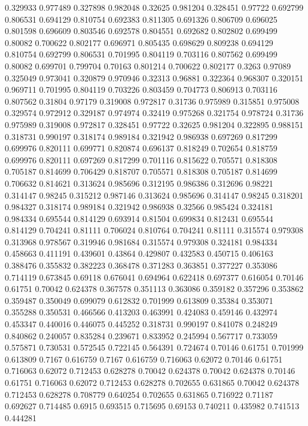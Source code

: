 0.329933 0.977489
0.327898 0.982048
0.32625 0.981204
0.328451 0.97722
0.692799 0.806531
0.694129 0.810754
0.692383 0.811305
0.691326 0.806709
0.696025 0.801598
0.696609 0.803546
0.692578 0.804551
0.692682 0.802802
0.699499 0.80082
0.700622 0.802177
0.696971 0.805435
0.698629 0.809238
0.694129 0.810754
0.692799 0.806531
0.701995 0.804119
0.703116 0.807562
0.699499 0.80082
0.699701 0.799704
0.70163 0.801214
0.700622 0.802177
0.3263 0.97089
0.325049 0.973041
0.320879 0.970946
0.32313 0.96881
0.322364 0.968307
0.320151 0.969711
0.701995 0.804119
0.703226 0.803459
0.704773 0.806913
0.703116 0.807562
0.31804 0.97179
0.319008 0.972817
0.31736 0.975989
0.315851 0.975008
0.329574 0.972912
0.329187 0.974974
0.32419 0.975268
0.321754 0.978724
0.31736 0.975989
0.319008 0.972817
0.328451 0.97722
0.32625 0.981204
0.322895 0.988151
0.318731 0.990197
0.318174 0.989184
0.321942 0.986938
0.697269 0.817299
0.699976 0.820111
0.699771 0.820874
0.696137 0.818249
0.702654 0.818759
0.699976 0.820111
0.697269 0.817299
0.701116 0.815622
0.705571 0.818308
0.705187 0.814699
0.706429 0.818707
0.705571 0.818308
0.705187 0.814699
0.706632 0.814621
0.313624 0.985696
0.312195 0.986386
0.312696 0.98221
0.314147 0.98245
0.315212 0.987146
0.313624 0.985696
0.314147 0.98245
0.318201 0.984327
0.318174 0.989184
0.321942 0.986938
0.32566 0.985424
0.324181 0.984334
0.695544 0.814129
0.693914 0.81504
0.699834 0.812431
0.695544 0.814129
0.704241 0.81111
0.706024 0.810764
0.704241 0.81111
0.315574 0.979308
0.313968 0.978567
0.319946 0.981684
0.315574 0.979308
0.324181 0.984334
0.458663 0.411191
0.439601 0.43864
0.429807 0.432583
0.450715 0.406163
0.388476 0.355832
0.382223 0.368478
0.371283 0.363851
0.377227 0.353086
0.714119 0.673845
0.69118 0.676041
0.694964 0.622418
0.697377 0.616054
0.70146 0.61751
0.70042 0.624378
0.367578 0.351113
0.363086 0.359182
0.357296 0.353862
0.359487 0.350049
0.699079 0.612832
0.701999 0.613809
0.35384 0.353071
0.355288 0.350531
0.466566 0.413203
0.463991 0.424083
0.459146 0.432974
0.453347 0.440016
0.446075 0.445252
0.318731 0.990197
0.841078 0.248249
0.840862 0.240057
0.835284 0.239671
0.833952 0.245994
0.567717 0.733059
0.575871 0.730531
0.572545 0.722145
0.564391 0.724674
0.70146 0.61751
0.701999 0.613809
0.7167 0.616759
0.7167 0.616759
0.716063 0.62072
0.70146 0.61751
0.716063 0.62072
0.712453 0.628278
0.70042 0.624378
0.70042 0.624378
0.70146 0.61751
0.716063 0.62072
0.712453 0.628278
0.702655 0.631865
0.70042 0.624378
0.712453 0.628278
0.708779 0.640254
0.702655 0.631865
0.716922 0.71187
0.692627 0.714485
0.6915 0.693515
0.715695 0.69153
0.740211 0.435982
0.741513 0.444281
